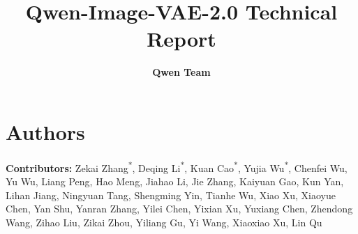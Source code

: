 \documentclass{article} %
\title{Qwen-Image-VAE-2.0 Technical Report}
\author{
\bf Qwen Team}
\begin{document}
\maketitle
\vspace{-3mm}



















\section{Authors}

\textbf{Contributors:} Zekai Zhang\textsuperscript{*}, Deqing Li\textsuperscript{*}, Kuan Cao\textsuperscript{*}, Yujia Wu\textsuperscript{*}, Chenfei Wu\textsuperscript{\textdagger}, Yu Wu, Liang Peng, Hao Meng, Jiahao Li, Jie Zhang, Kaiyuan Gao, Kun Yan, Lihan Jiang, Ningyuan Tang, Shengming Yin, Tianhe Wu, Xiao Xu, Xiaoyue Chen, Yan Shu, Yanran Zhang, Yilei Chen, Yixian Xu, Yuxiang Chen, Zhendong Wang, Zihao Liu, Zikai Zhou, Yiliang Gu, Yi Wang, Xiaoxiao Xu, Lin Qu

\begingroup
  \renewcommand\thefootnote{}
  \addtocounter{footnote}{-1}
\endgroup

\clearpage


\end{document}
